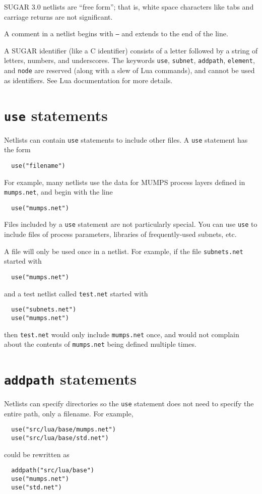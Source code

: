 SUGAR 3.0 netlists are ``free form''; that is, white space characters
like tabs and carriage returns are not significant.

A comment in a netlist begins with \texttt{--} and extends to the end of
the line. 

A SUGAR identifier (like a C identifier) consists of a letter
followed by a string of letters, numbers, and underscores.  
The keywords \texttt{use}, \texttt{subnet}, \texttt{addpath}, 
\texttt{element}, and \texttt{node} are reserved (along with a slew of Lua
commands), and cannot be used as identifiers. See Lua documentation for
more details.

\section{\texttt{use} statements}

Netlists can contain \texttt{use} statements to include other files.
A \texttt{use} statement has the form
\begin{verbatim}
  use("filename")
\end{verbatim}
For example, many netlists use the data for MUMPS process layers defined in 
\texttt{mumps.net}, and begin with the line
\begin{verbatim}
  use("mumps.net")
\end{verbatim}
Files included by a \texttt{use} statement are not particularly
special. You can use \texttt{use} to include files of process parameters,
libraries of frequently-used subnets, etc.  

A file will only be used once in a netlist.  
For example, if the file \texttt{subnets.net} started with
\begin{verbatim}
  use("mumps.net")
\end{verbatim}
and a test netlist called \texttt{test.net} started with
\begin{verbatim}
  use("subnets.net")
  use("mumps.net")
\end{verbatim}
then \texttt{test.net} would only include \texttt{mumps.net} once, and 
would not complain about the contents of \texttt{mumps.net} being defined 
multiple times.


\section{\texttt{addpath} statements}

Netlists can specify directories so the \texttt{use} statement does not need
to specify the entire path, only a filename. For example,
\begin{verbatim}
  use("src/lua/base/mumps.net")
  use("src/lua/base/std.net")
\end{verbatim}
could be rewritten as
\begin{verbatim}
  addpath("src/lua/base")
  use("mumps.net")
  use("std.net")
\end{verbatim}


